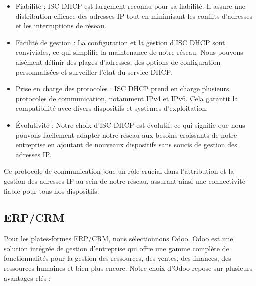 \begin{itemize}

\item Fiabilité : ISC DHCP est largement reconnu pour sa fiabilité. Il assure une distribution efficace des adresses IP tout en minimisant les conflits d'adresses et les interruptions de réseau.\\

\item Facilité de gestion : La configuration et la gestion d'ISC DHCP sont conviviales, ce qui simplifie la maintenance de notre réseau. Nous pouvons aisément définir des plages d'adresses, des options de configuration personnalisées et surveiller l'état du service DHCP.\\

\item Prise en charge des protocoles : ISC DHCP prend en charge plusieurs protocoles de communication, notamment IPv4 et IPv6. Cela garantit la compatibilité avec divers dispositifs et systèmes d'exploitation.\\

\item Évolutivité : Notre choix d'ISC DHCP est évolutif, ce qui signifie que nous pouvons facilement adapter notre réseau aux besoins croissants de notre entreprise en ajoutant de nouveaux dispositifs sans soucis de gestion des adresses IP.\\

\end{itemize}

Ce protocole de communication joue un rôle crucial dans l'attribution et la gestion des adresses IP au sein de notre réseau, assurant ainsi une connectivité fiable pour tous nos dispositifs.

\subsection{ERP/CRM}

Pour les plates-formes ERP/CRM, nous sélectionnons Odoo. Odoo est une solution intégrée de gestion d'entreprise qui offre une gamme complète de fonctionnalités pour la gestion des ressources, des ventes, des finances, des ressources humaines et bien plus encore. Notre choix d'Odoo repose sur plusieurs avantages clés :

